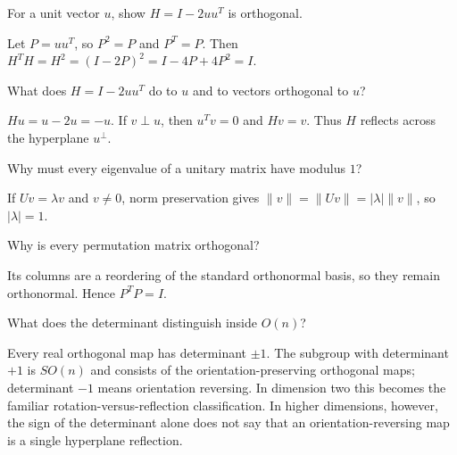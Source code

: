 \begin{problem}\label{prob:i15-problem-04}
For a unit vector $u$, show $H=I-2uu^T$ is orthogonal.
\end{problem}
\begin{solution}
Let $P=uu^T$, so $P^2=P$ and $P^T=P$. Then $H^TH=H^2=(I-2P)^2=I-4P+4P^2=I$.
\end{solution}

\begin{problem}\label{prob:i15-problem-05}
What does $H=I-2uu^T$ do to $u$ and to vectors orthogonal to $u$?
\end{problem}
\begin{solution}
$Hu=u-2u=-u$. If $v\perp u$, then $u^Tv=0$ and $Hv=v$. Thus $H$ reflects across the hyperplane $u^\perp$.
\end{solution}

\begin{problem}\label{prob:i15-problem-06}
Why must every eigenvalue of a unitary matrix have modulus $1$?
\end{problem}
\begin{solution}
If $Uv=\lambda v$ and $v\ne0$, norm preservation gives $\|v\|=\|Uv\|=|\lambda|\|v\|$, so $|\lambda|=1$.
\end{solution}

\begin{problem}\label{prob:i15-problem-07}
Why is every permutation matrix orthogonal?
\end{problem}
\begin{solution}
Its columns are a reordering of the standard orthonormal basis, so they remain orthonormal. Hence $P^TP=I$.
\end{solution}

\begin{problem}\label{prob:i15-problem-08}
What does the determinant distinguish inside $O(n)$?
\end{problem}
\begin{solution}
Every real orthogonal map has determinant $\pm1$. The subgroup with determinant $+1$ is $SO(n)$ and consists of the orientation-preserving orthogonal maps; determinant $-1$ means orientation reversing. In dimension two this becomes the familiar rotation-versus-reflection classification. In higher dimensions, however, the sign of the determinant alone does not say that an orientation-reversing map is a single hyperplane reflection.
\end{solution}

